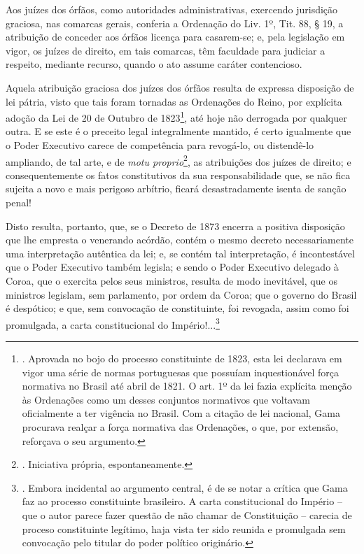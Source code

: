 Aos juízes dos órfãos, como autoridades administrativas, exercendo
jurisdição graciosa, nas comarcas gerais, conferia a Ordenação do Liv.
1º, Tit. 88, § 19, a atribuição de conceder aos órfãos licença para
casarem-se; e, pela legislação em vigor, os juízes de direito, em tais
comarcas, têm faculdade para judiciar a respeito, mediante recurso,
quando o ato assume caráter contencioso.

Aquela atribuição graciosa dos juízes dos órfãos resulta de expressa
disposição de lei pátria, visto que tais foram tornadas as Ordenações do
Reino, por explícita adoção da Lei de 20 de Outubro de 1823\footnote{.
  Aprovada no bojo do processo constituinte de 1823, esta lei declarava
  em vigor uma série de normas portuguesas que possuíam inquestionável
  força normativa no Brasil até abril de 1821. O art. 1º da lei fazia
  explícita menção às Ordenações como um desses conjuntos normativos que
  voltavam oficialmente a ter vigência no Brasil. Com a citação de lei
  nacional, Gama procurava realçar a força normativa das Ordenações, o
  que, por extensão, reforçava o seu argumento.}, até hoje não derrogada
por qualquer outra. E se este é o preceito legal integralmente mantido,
é certo igualmente que o Poder Executivo carece de competência para
revogá-lo, ou distendê-lo ampliando, de tal arte, e de \emph{motu
proprio}\footnote{. Iniciativa própria, espontaneamente.}, as
atribuições dos juízes de direito; e consequentemente os fatos
constitutivos da sua responsabilidade que, se não fica sujeita a novo e
mais perigoso arbítrio, ficará desastradamente isenta de sanção penal!

Disto resulta, portanto, que, se o Decreto de 1873 encerra a positiva
disposição que lhe empresta o venerando acórdão, contém o mesmo decreto
necessariamente uma interpretação autêntica da lei; e, se contém tal
interpretação, é incontestável que o Poder Executivo também legisla; e
sendo o Poder Executivo delegado à Coroa, que o exercita pelos seus
ministros, resulta de modo inevitável, que os ministros legislam, sem
parlamento, por ordem da Coroa; que o governo do Brasil é despótico; e
que, sem convocação de constituinte, foi revogada, assim como foi
promulgada, a carta constitucional do Império!...\footnote{. Embora
  incidental ao argumento central, é de se notar a crítica que Gama faz
  ao processo constituinte brasileiro. A carta constitucional do Império
  -- que o autor parece fazer questão de não chamar de Constituição --
  carecia de proceso constituinte legítimo, haja vista ter sido reunida
  e promulgada sem convocação pelo titular do poder político originário.}

